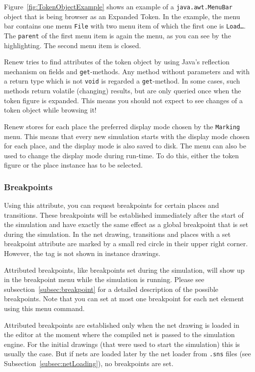 Figure~\ref{fig:TokenObjectExample} shows an example of a
\texttt{java.awt.MenuBar} object that is being browser as an Expanded
Token. In the example, the menu bar contains one menu \texttt{File}
with two menu item of which the first one is \texttt{Load\dots{}}.
The \texttt{parent} of the first menu item is again the menu, as you
can see by the highlighting. The second menu item is closed.

Renew tries to find attributes of the token object by using Java's
reflection mechanism on fields and \texttt{get}-methods.
Any method without parameters and with a return type which is not
\texttt{void} is regarded a \texttt{get}-method.
In some cases, such methods return volatile (changing) results, but
are only queried once when the token figure is expanded.
This means you should not expect to see changes of a token object
while browsing it!

Renew stores for each place the preferred display mode chosen by
the \texttt{Marking} menu. This means that every new simulation starts
with the display mode chosen for each place, and the display mode is
also saved to disk.
The menu can also be used to change the display mode during run-time.
To do this, either the token figure or the place instance has to be
selected.

\subsubsection{Breakpoints}

Using this attribute, you can request breakpoints for certain
places and transitions. These breakpoints will be established
immediately after the start of the simulation and have exactly
the same effect as a global breakpoint that is set during the
simulation.
In the net drawing, transitions and places with a set
breakpoint attribute are marked by a small red circle in their upper
right corner.
However, the tag is not shown in instance drawings.

Attributed breakpoints, like breakpoints set during the
simulation, will show up in the breakpoint menu while the
simulation is running.
Please see subsection~\ref{subsec:breakpoint}
for a detailed description of the possible breakpoints. Note that you
can set at most one breakpoint for each net element
using this menu command.

Attributed breakpoints are established only when the net drawing is loaded
in the editor at the moment where the compiled net is passed to the
simulation engine.
For the initial drawings (that were used to start the simulation) this is
usually the case.
But if nets are loaded later by the net loader from \texttt{.sns} files
(see Subsection~\ref{subsec:netLoading}), no breakpoints are set.

